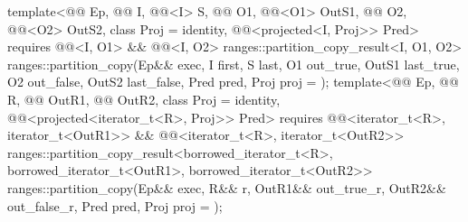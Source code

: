 \begin{itemdecl}
template<@@ Ep, @@ I, @@<I> S,
         @@ O1, @@<O1> OutS1,
         @@ O2, @@<O2> OutS2,
         class Proj = identity, @@<projected<I, Proj>> Pred>
  requires @@<I, O1> && @@<I, O2>
  ranges::partition_copy_result<I, O1, O2>
    ranges::partition_copy(Ep&& exec, I first, S last, O1 out_true, OutS1 last_true,
                           O2 out_false, OutS2 last_false, Pred pred, Proj proj = {});
template<@@ Ep, @@ R,
         @@ OutR1, @@ OutR2,
         class Proj = identity,
         @@<projected<iterator_t<R>, Proj>> Pred>
  requires @@<iterator_t<R>, iterator_t<OutR1>> &&
            @@<iterator_t<R>, iterator_t<OutR2>>
  ranges::partition_copy_result<borrowed_iterator_t<R>, borrowed_iterator_t<OutR1>,
                                borrowed_iterator_t<OutR2>>
    ranges::partition_copy(Ep&& exec, R&& r, OutR1&& out_true_r, OutR2&& out_false_r,
                           Pred pred, Proj proj = {});
\end{itemdecl}

